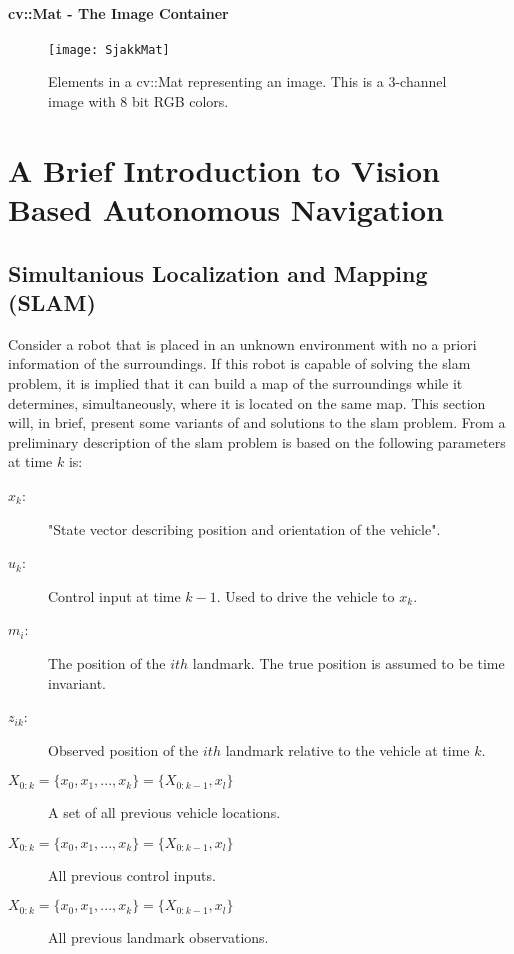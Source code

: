 \paragraph{cv::Mat - The Image Container}

\begin{figure}
\centering
\texttt{[image: SjakkMat]}
\caption{Elements in a cv::Mat representing an image. This is a 3-channel image with 8 bit RGB colors.}
\label{fig:matGrid}
\end{figure}

\section{A Brief Introduction to Vision Based Autonomous Navigation}

\subsection{Simultanious Localization and Mapping (SLAM)}

Consider a robot that is placed in an unknown environment with no a priori information of the surroundings. If this robot is capable of solving the \gls{slam} problem, it is implied that it can build a map of the surroundings while it determines, simultaneously, where it is located on the same map. This section will, in brief, present some variants of and solutions to the \gls{slam} problem. From \cite{SLAMp1} a preliminary description of the \gls{slam} problem is based on the following parameters at time $k$ is:
\vspace{-10pt} %
\begin{description}
	\item[\boldmath$x_k$:] "State vector describing position and orientation of the vehicle"\cite{SLAMp1}.
	\item[\boldmath$u_k$:] Control input at time $k - 1$. Used to drive the vehicle to $x_k$. 
	\item[\boldmath$m_i$:] The position of the $ith$ landmark. The true position is assumed to be time invariant.
	\item[\boldmath$z_{ik}$:] Observed position of the $ith$ landmark relative to the vehicle at time $k$.
	\item[\boldmath$X_{0:k} = \{ x_0, x_1, ... , x_k\} = \{ X_{0:k-1}, x_l \}$] A set of all previous vehicle locations. 
	\item[\boldmath$X_{0:k} = \{ x_0, x_1, ... , x_k\} = \{ X_{0:k-1}, x_l \}$] All previous control inputs.
	\item[\boldmath$X_{0:k} = \{ x_0, x_1, ... , x_k\} = \{ X_{0:k-1}, x_l \}$] All previous landmark observations.
\end{description}

